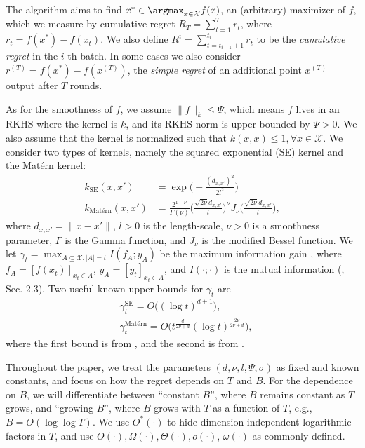 \documentclass[10pt]{article}
\begin{document}
The algorithm aims to find $x^*\in\argmax_{x\in\mathcal{X}} f(x)$, an (arbitrary) maximizer of $f$, which we measure by cumulative regret $R_T = \sum_{t=1}^T r_t $, where $r_t = f(x^*) - f(x_t)$. We also define $R^i =\sum_{t=t_{i-1}+1}^{t_i} r_t $ to be the \emph{cumulative regret} in the $i$-th batch.  In some cases we also consider $r^{(T)} = f(x^*) - f(x^{(T)})$, the \emph{simple regret} of an additional point $x^{(T)}$ output after $T$ rounds. 

As for the smoothness of $f$, we assume $\lVert f\rVert_k \leq \Psi$, which means $f$ lives in an RKHS where the kernel is $k$, and its RKHS norm is upper bounded by $\Psi > 0$. We also assume that the kernel is normalized such that $k(x,x)\leq 1, \forall x\in\mathcal{X}$.
We consider two types of kernels, namely the squared exponential (SE) kernel and the Mat\'ern kernel:
\begin{align*}
    k_{\text{SE}}(x,x') & = \exp\biggl(-\frac{(d_{x,x'})^2}{2l^2}\biggr) \\
    k_{\text{Mat\'ern}}(x,x') & = \frac{2^{1-\nu}}{\Gamma(\nu)} \biggl(\frac{\sqrt{2\nu}d_{x,x'}}{l}\biggr)^{\nu} J_{\nu}\biggl(\frac{\sqrt{2\nu}d_{x,x'}}{l}\biggr),
\end{align*}
where $d_{x,x'}=\lVert x-x'\rVert$, $l>0$ is the length-scale, $\nu > 0$ is a smoothness parameter, $\Gamma$ is the Gamma function, and $J_{\nu}$ is the modified Bessel function.
We let $\gamma_t = \max_{A\subseteq \mathcal{X}:\lvert A\rvert=t} I(f_A;y_A) $ be the maximum information gain \citep{Srinivas10}, where $f_A=[f(x_t)]_{x_t\in A} $, $y_A=[y_t]_{x_t\in A} $, and $I(\cdot;\cdot)$ is the mutual information (\cite{Cover06}, Sec. 2.3). Two useful known upper bounds for $\gamma_t$ are
\begin{align}
    & \gamma_t^{\text{SE}} = O\bigl((\log t)^{d+1}\bigr), \label{gamma_t_se} \\
    & \gamma_t^{\text{Mat\'ern}} = O \bigl( t^{\frac{d}{2\nu+d}} \left( \log t \right)^{\frac{2\nu}{2\nu +d}} \bigr), \label{gamma_t_mat}
\end{align}
where the first bound is from \citep{Srinivas10}, and the second is from \citep{Vakili21b}.

Throughout the paper, we treat the parameters $(d,\nu,l, \Psi, \sigma)$ as fixed and known constants, and focus on how the regret depends on $T$ and $B$. For the dependence on $B$, we will differentiate between ``constant $B$'', where $B$ remains constant as $T$ grows,
and ``growing $B$'', where $B$ grows with $T$ as a function of $T$, e.g., $B= O(\log\log T)$.
We use $O^*(\cdot)$ to hide dimension-independent logarithmic factors in $T$, and use $O(\cdot),\Omega(\cdot),\Theta(\cdot), o(\cdot)$, $\omega(\cdot)$ as commonly defined.
\end{document}
